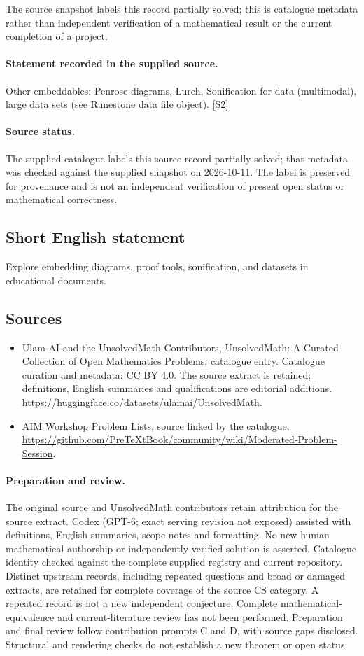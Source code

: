 \documentclass[11pt]{article}
\begin{document}
The source snapshot labels this record partially solved; this is catalogue metadata rather than independent verification of a mathematical result or the current completion of a project.
\paragraph{Statement recorded in the supplied source.}
Other embeddables: Penrose diagrams, Lurch, Sonification for data (multimodal), large data sets (see Runestone data file object). \href{https://github.com/PreTeXtBook/community/wiki/Moderated-Problem-Session}{[S2]}
\paragraph{Source status.}
The supplied catalogue labels this source record partially solved; that metadata was checked against the supplied snapshot on 2026-10-11. The label is preserved for provenance and is not an independent verification of present open status or mathematical correctness.
\subsection{Short English statement}
Explore embedding diagrams, proof tools, sonification, and datasets in educational documents.
\subsection{Sources}
\begin{itemize}
\item[S1] Ulam AI and the UnsolvedMath Contributors, UnsolvedMath: A Curated Collection of Open Mathematics Problems, catalogue entry. Catalogue curation and metadata: CC BY 4.0. The source extract is retained; definitions, English summaries and qualifications are editorial additions.
\url{https://huggingface.co/datasets/ulamai/UnsolvedMath}.
\item[S2] AIM Workshop Problem Lists, source linked by the catalogue.
\url{https://github.com/PreTeXtBook/community/wiki/Moderated-Problem-Session}.
\end{itemize}
\paragraph{Preparation and review.}
The original source and UnsolvedMath contributors retain attribution for the source extract. Codex (GPT-6; exact serving revision not exposed) assisted with definitions, English summaries, scope notes and formatting. No new human mathematical authorship or independently verified solution is asserted. Catalogue identity checked against the complete supplied registry and current repository. Distinct upstream records, including repeated questions and broad or damaged extracts, are retained for complete coverage of the source CS category. A repeated record is not a new independent conjecture. Complete mathematical-equivalence and current-literature review has not been performed. Preparation and final review follow contribution prompts C and D, with source gaps disclosed. Structural and rendering checks do not establish a new theorem or open status.
\label{end:statement}
\end{document}
